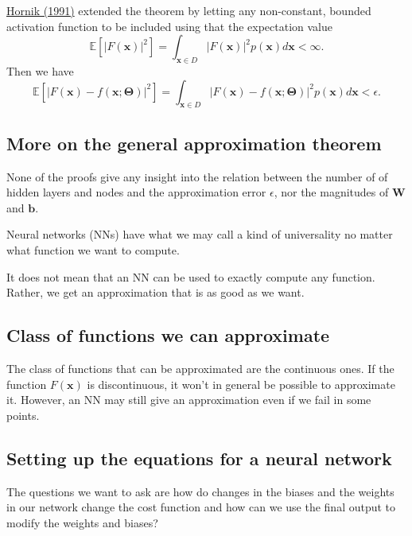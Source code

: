 \documentclass[%
oneside,                 %
final,                   %
10pt]{article}
\begin{document}
\href{{https://www.sciencedirect.com/science/article/abs/pii/089360809190009T}}{Hornik (1991)} extended the theorem by letting any non-constant, bounded activation function to be included using that the expectation value
\[
\mathbb{E}[\vert F(\bm{x})\vert^2] =\int_{\bm{x}\in D} \vert F(\bm{x})\vert^2p(\bm{x})d\bm{x} < \infty.
\]
Then we have
\[
\mathbb{E}[\vert F(\bm{x})-f(\bm{x};\bm{\Theta})\vert^2] =\int_{\bm{x}\in D} \vert F(\bm{x})-f(\bm{x};\bm{\Theta})\vert^2p(\bm{x})d\bm{x} < \epsilon.
\]

\subsection{More on the general approximation theorem}

None of the proofs give any insight into the relation between the
number of of hidden layers and nodes and the approximation error
$\epsilon$, nor the magnitudes of $\bm{W}$ and $\bm{b}$.

Neural networks (NNs) have what we may call a kind of universality no matter what function we want to compute.

\begin{block}{}
It does not mean that an NN can be used to exactly compute any function. Rather, we get an approximation that is as good as we want. 
\end{block}

\subsection{Class of functions we can approximate}

\begin{block}{}
The class of functions that can be approximated are the continuous ones.
If the function $F(\bm{x})$ is discontinuous, it won't in general be possible to approximate it. However, an NN may still give an approximation even if we fail in some points.
\end{block}

\subsection{Setting up the equations for a neural network}

The questions we want to ask are how do changes in the biases and the
weights in our network change the cost function and how can we use the
final output to modify the weights and biases?
\end{document}
